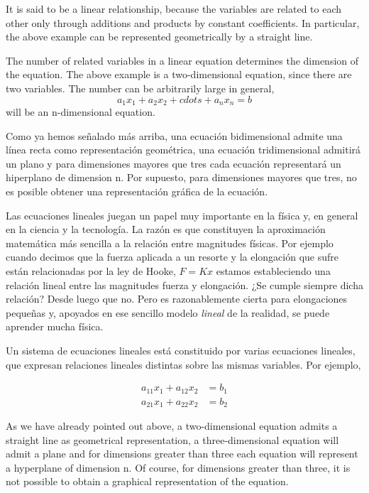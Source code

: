 \begin{paracol}{2}
It is said to be a linear relationship, because the variables are related to each other only through additions and products by constant coefficients. In particular, the above example can be represented geometrically by a straight line.

The number of related variables in a linear equation determines the dimension of the equation. The above example is a two-dimensional equation, since there are two variables. The number can be arbitrarily large in general,
\begin{equation*}
a_1x_1+a_2x_2+cdots +a_nx_n=b
\end{equation*} 
will be an n-dimensional equation.

\switchcolumn
Como ya hemos señalado más arriba, una ecuación bidimensional admite una línea recta como representación geométrica, una ecuación tridimensional admitirá un plano y para dimensiones mayores que tres cada ecuación representará un hiperplano de dimension n. Por supuesto, para dimensiones mayores que tres, no es posible obtener una representación gráfica de la ecuación.

Las ecuaciones lineales juegan un papel muy importante en la física y, en general en la ciencia y la tecnología. La razón es que constituyen la aproximación matemática más sencilla a la relación entre magnitudes físicas. Por ejemplo cuando decimos que la fuerza aplicada a un resorte y la elongación  que sufre están relacionadas por la ley de Hooke, $F=Kx$ estamos estableciendo una relación lineal entre las magnitudes fuerza y elongación. ¿Se cumple siempre dicha relación? Desde luego que no. Pero es razonablemente cierta para elongaciones pequeñas y, apoyados en ese sencillo modelo \emph{lineal} de la realidad, se puede aprender mucha física.

Un sistema de ecuaciones lineales está constituido por varias ecuaciones lineales, que expresan relaciones lineales distintas sobre las mismas variables. Por ejemplo,

\begin{align*}
a_{11}x_1+a_{12}x_2&=b_1\\
a_{21}x_1+a_{22}x_2&=b_2
\end{align*}

\switchcolumn
As we have already pointed out above, a two-dimensional equation admits a straight line as geometrical representation, a three-\-di\-men\-sio\-nal equation will admit a plane and for dimensions greater than three each equation will represent a hyperplane of dimension n. Of course, for dimensions greater than three, it is not possible to obtain a graphical representation of the equation.


\end{paracol}
